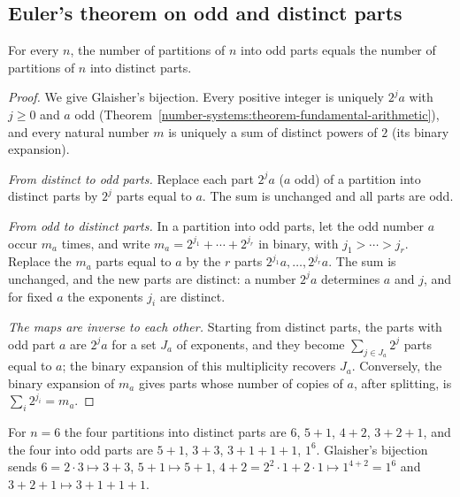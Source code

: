 \subsection{Euler's theorem on odd and distinct parts}\label{combinatorics:subsection-euler-partitions}

\begin{theorem}[Euler]\label{combinatorics:theorem-odd-distinct}
For every $n$, the number of partitions of $n$ into odd parts equals the number of partitions of $n$ into distinct parts.
\end{theorem}

\begin{proof}
We give Glaisher's bijection. Every positive integer is uniquely $2^ja$ with $j \geq 0$ and $a$ odd (Theorem~\ref{number-systems:theorem-fundamental-arithmetic}), and every natural number $m$ is uniquely a
sum of distinct powers of $2$ (its binary expansion).

\emph{From distinct to odd parts.} Replace each part $2^ja$ ($a$ odd) of a partition into distinct parts by $2^j$ parts equal to $a$. The sum is unchanged and all parts are odd.

\emph{From odd to distinct parts.} In a partition into odd parts, let the odd number $a$ occur $m_a$ times, and write $m_a = 2^{j_1} + \cdots + 2^{j_r}$ in binary, with $j_1 > \cdots > j_r$. Replace the
$m_a$ parts equal to $a$ by the $r$ parts $2^{j_1}a, \ldots, 2^{j_r}a$. The sum is unchanged, and the new parts are distinct: a number $2^ja$ determines $a$ and $j$, and for fixed $a$ the exponents $j_i$
are distinct.

\emph{The maps are inverse to each other.} Starting from distinct parts, the parts with odd part $a$ are $2^ja$ for a set $J_a$ of exponents, and they become $\sum_{j \in J_a}2^j$ parts equal to $a$;
the binary expansion of this multiplicity recovers $J_a$. Conversely, the binary expansion of $m_a$ gives parts whose number of copies of $a$, after splitting, is $\sum_i2^{j_i} = m_a$.
\end{proof}

\begin{example}\label{combinatorics:example-odd-distinct}
For $n = 6$ the four partitions into distinct parts are $6$, $5 + 1$, $4 + 2$, $3 + 2 + 1$, and the four into odd parts are $5 + 1$, $3 + 3$, $3 + 1 + 1 + 1$, $1^6$. Glaisher's bijection sends
$6 = 2 \cdot 3 \mapsto 3 + 3$, $5 + 1 \mapsto 5 + 1$, $4 + 2 = 2^2 \cdot 1 + 2 \cdot 1 \mapsto 1^{4 + 2} = 1^6$ and $3 + 2 + 1 \mapsto 3 + 1 + 1 + 1$.
\end{example}

